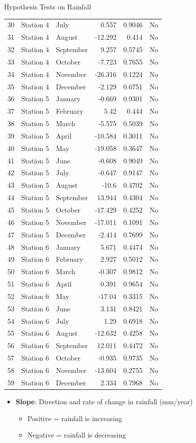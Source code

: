 \documentclass[12pt]{article}
\theoremstyle{definition}
\begin{document}
\begin{section}{Hypothesis Tests on Rainfall}
\begin{longtable}{|c|l|l|r|r|l|}
30 & Station 4 & July & 0.557 & 0.9046 & No \\
31 & Station 4 & August & -12.292 & 0.414 & No \\
32 & Station 4 & September & 9.257 & 0.5745 & No \\
33 & Station 4 & October & -7.723 & 0.7655 & No \\
34 & Station 4 & November & -26.316 & 0.1224 & No \\
35 & Station 4 & December & -2.129 & 0.6751 & No \\
36 & Station 5 & January & -0.669 & 0.9301 & No \\
37 & Station 5 & February & 5.42 & 0.444 & No \\
38 & Station 5 & March & -5.575 & 0.5039 & No \\
39 & Station 5 & April & -10.584 & 0.3011 & No \\
40 & Station 5 & May & -19.058 & 0.3647 & No \\
41 & Station 5 & June & -0.608 & 0.9049 & No \\
42 & Station 5 & July & -0.647 & 0.9147 & No \\
43 & Station 5 & August & -10.6 & 0.4702 & No \\
44 & Station 5 & September & 13.944 & 0.4304 & No \\
45 & Station 5 & October & -17.429 & 0.4252 & No \\
46 & Station 5 & November & -17.011 & 0.1091 & No \\
47 & Station 5 & December & -2.414 & 0.7699 & No \\
48 & Station 6 & January & 5.671 & 0.4474 & No \\
49 & Station 6 & February & 2.927 & 0.5012 & No \\
50 & Station 6 & March & -0.307 & 0.9812 & No \\
51 & Station 6 & April & 0.391 & 0.9654 & No \\
52 & Station 6 & May & -17.04 & 0.3315 & No \\
53 & Station 6 & June & 3.131 & 0.8421 & No \\
54 & Station 6 & July & 1.29 & 0.6918 & No \\
55 & Station 6 & August & -12.632 & 0.4258 & No \\
56 & Station 6 & September & 12.011 & 0.4472 & No \\
57 & Station 6 & October & -0.935 & 0.9735 & No \\
58 & Station 6 & November & -13.604 & 0.2755 & No \\
59 & Station 6 & December & 2.334 & 0.7968 & No \\
\end{longtable}
\begin{itemize}
    \item \textbf{Slope}: Direction and rate of change in rainfall (mm/year)
    \begin{itemize}
        \item Positive = rainfall is increasing
        \item Negative = rainfall is decreasing
    \end{itemize}
    

\end{itemize}
\end{section}
\end{document}
